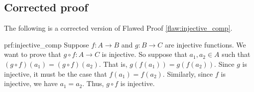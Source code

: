 \clearpage
\subsection{Corrected proof}

The following is a corrected version of Flawed Proof \ref{flaw:injective_comp}. 

\begin{prf}{prf:injective_comp} 
Suppose $f:A \rightarrow B$ and $g:B \rightarrow C$ are injective functions. We want to prove that $g \circ f : A \rightarrow C$ is injective. So suppose that $a_1, a_2 \in A$ such that $(g \circ f)(a_1) = (g \circ f)(a_2).$ That is, $g(f(a_1))=g(f(a_2)).$ Since $g$ is injective, it must be the case that $f(a_1)=f(a_2).$ Similarly, since $f$ is injective, we have $a_1=a_2.$ Thus, $g \circ f$ is injective. 
\end{prf}
